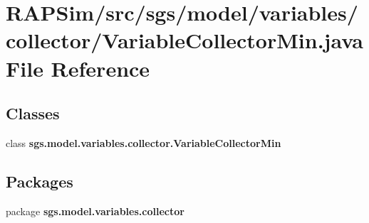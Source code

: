 \section{R\-A\-P\-Sim/src/sgs/model/variables/collector/\-Variable\-Collector\-Min.java File Reference}
\label{_variable_collector_min_8java}
\subsection*{Classes}
\begin{DoxyCompactItemize}
\item 
class {\bf sgs.\-model.\-variables.\-collector.\-Variable\-Collector\-Min}
\end{DoxyCompactItemize}
\subsection*{Packages}
\begin{DoxyCompactItemize}
\item 
package {\bf sgs.\-model.\-variables.\-collector}
\end{DoxyCompactItemize}
